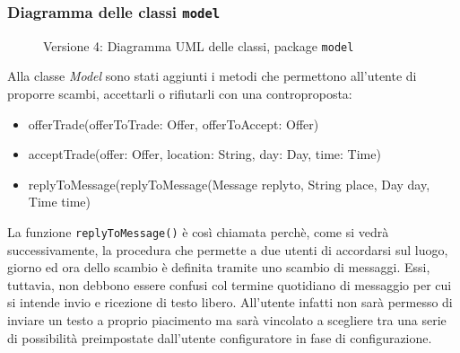 \subsubsection{Diagramma delle classi \texttt{model}}
\vspace{0.5cm}
\begin{figure}[H]
    \centering
    \caption{Versione 4: Diagramma UML delle classi, package \texttt{model}}
    \label{fig:class_model_v_4}
\end{figure}

Alla classe \textit{Model} sono stati aggiunti i metodi che permettono all'utente di proporre scambi, accettarli o rifiutarli con una controproposta:
\begin{itemize}
    \item offerTrade(offerToTrade: Offer, offerToAccept: Offer)
    \item acceptTrade(offer: Offer, location: String, day: Day, time: Time)
    \item replyToMessage(replyToMessage(Message replyto, String place, Day day, Time time)
\end{itemize}

La funzione \texttt{replyToMessage()} è così chiamata perchè, come si vedrà successivamente, la procedura che permette a due utenti di accordarsi sul luogo, giorno ed ora dello scambio
è definita tramite uno scambio di messaggi. Essi, tuttavia, non debbono essere confusi col termine quotidiano di messaggio per cui si intende invio e ricezione di testo libero.
All'utente infatti non sarà permesso di inviare un testo a proprio piacimento ma sarà vincolato a scegliere tra una serie di possibilità preimpostate dall'utente configuratore in fase di configurazione.